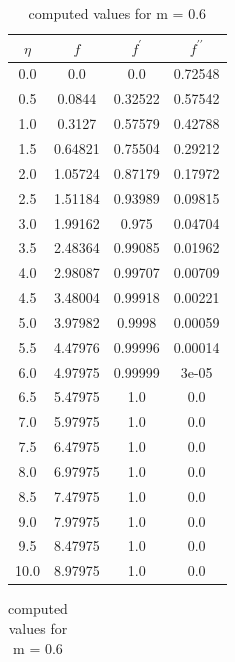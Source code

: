 \begin{table}
    \parbox{0.45\linewidth}{
        \centering
        \caption{computed values for m = 0.3}
        \begin{tabular}{|c|c|c|c|}
            \hline
            $\eta$ & $f$ & $f^\prime$ & $f^{\prime\prime}$ \\ \hline
                0.0 & 0.0 & 0.0 & 0.72548 \\ \hline
                0.5 & 0.0844 & 0.32522 & 0.57542 \\ \hline
                1.0 & 0.3127 & 0.57579 & 0.42788 \\ \hline
                1.5 & 0.64821 & 0.75504 & 0.29212 \\ \hline
                2.0 & 1.05724 & 0.87179 & 0.17972 \\ \hline
                2.5 & 1.51184 & 0.93989 & 0.09815 \\ \hline
                3.0 & 1.99162 & 0.975 & 0.04704 \\ \hline
                3.5 & 2.48364 & 0.99085 & 0.01962 \\ \hline
                4.0 & 2.98087 & 0.99707 & 0.00709 \\ \hline
                4.5 & 3.48004 & 0.99918 & 0.00221 \\ \hline
                5.0 & 3.97982 & 0.9998 & 0.00059 \\ \hline
                5.5 & 4.47976 & 0.99996 & 0.00014 \\ \hline
                6.0 & 4.97975 & 0.99999 & 3e-05 \\ \hline
                6.5 & 5.47975 & 1.0 & 0.0 \\ \hline
                7.0 & 5.97975 & 1.0 & 0.0 \\ \hline
                7.5 & 6.47975 & 1.0 & 0.0 \\ \hline
                8.0 & 6.97975 & 1.0 & 0.0 \\ \hline
                8.5 & 7.47975 & 1.0 & 0.0 \\ \hline
                9.0 & 7.97975 & 1.0 & 0.0 \\ \hline
                9.5 & 8.47975 & 1.0 & 0.0 \\ \hline
                10.0 & 8.97975 & 1.0 & 0.0 \\ \hline
        \end{tabular}
        \label{table_m3}
    }
    \hfill
    \parbox{0.45\linewidth}{
        \centering
        \caption{computed values for m = 0.6}
        \begin{tabular}{|c|c|c|c|}

\end{tabular}}
\end{table}
